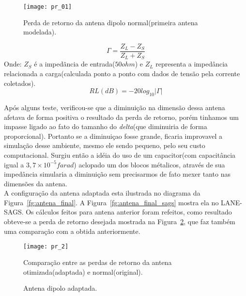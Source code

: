 \begin{figure}[!ht]
	\centering
	\texttt{[image: pr\_01]}
	\caption{Perda de retorno da antena dipolo normal(primeira antena modelada).}
	\label{fg:pr_01}
\end{figure}

\begin{equation}\label{eq:impedancia}
	\Gamma = \frac{Z_{L} - Z_{S}}{Z_{L} + Z_{S}}
\end{equation}
Onde: $Z_{S}$ é a impedãncia de entrada($50 ohm$) e $Z_{L}$ representa a impedância relacionada a carga(calculada ponto a ponto com dados de tensão pela corrente coletados).
\begin{equation}\label{eq:pr}
	RL(dB) = -20log_{10} |\Gamma|
\end{equation}

Após alguns teste, verificou-se que a diminuição na dimensão dessa antena afetava de forma positiva o resultado da perda de retorno, porém tinhamos um impasse ligado ao fato do tamanho do \textit{delta}(que diminuiria de forma proporcional). Portanto se a diminuiçao fosse grande, ficaria improvavel a simulação desse ambiente, mesmo ele sendo pequeno, pelo seu custo computacional. Surgiu então a idéia do uso de um capacitor(com capacitância igual a $3,7\times10^{-5} farad$) aclopado um dos blocos métalicos, através de sua impedância simularia a diminuição sem precisarmos de fato mexer tanto nas dimensões da antena.\\

A configuração da antena adaptada esta ilustrada no diagrama da Figura~\ref{fg:antena_final}. A Figura~\ref{fg:antena_final_sags} mostra ela no LANE-SAGS. Os cálculos feitos para antena anterior foram refeitos, como resultado obteve-se a perda de retorno desejada mostrada na Figura~\ref{fg:pr_2}, que faz também uma comparação com a obtida anteriormente.\\

\begin{figure}[!ht]
	\centering
	\texttt{[image: pr\_2]}
	\caption{Comparação entre as perdas de retorno da antena otimizada(adaptada) e normal(original).}
	\label{fg:pr_2}
\end{figure}

\begin{figure}[!ht]
	\begin{center}
\qquad
	\end{center}
	\caption{Antena dipolo adaptada.}
	\label{fg:antena_apatada}
\end{figure}

